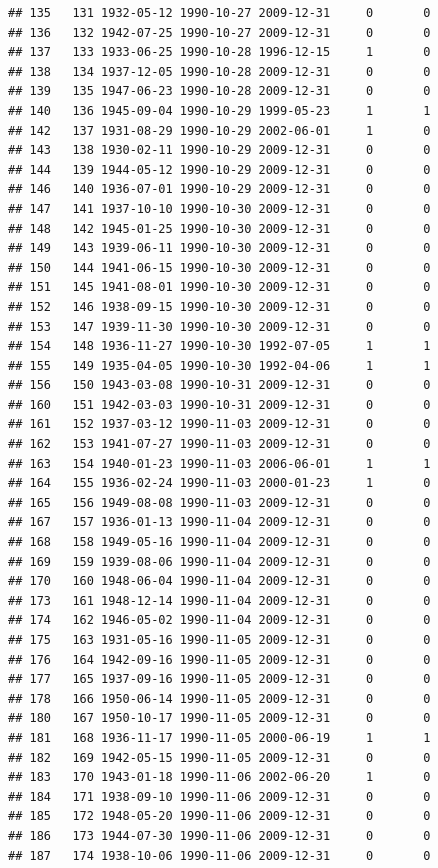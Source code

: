 \documentclass[
]{book}
\begin{document}
\begin{verbatim}
## 135   131 1932-05-12 1990-10-27 2009-12-31     0       0
## 136   132 1942-07-25 1990-10-27 2009-12-31     0       0
## 137   133 1933-06-25 1990-10-28 1996-12-15     1       0
## 138   134 1937-12-05 1990-10-28 2009-12-31     0       0
## 139   135 1947-06-23 1990-10-28 2009-12-31     0       0
## 140   136 1945-09-04 1990-10-29 1999-05-23     1       1
## 142   137 1931-08-29 1990-10-29 2002-06-01     1       0
## 143   138 1930-02-11 1990-10-29 2009-12-31     0       0
## 144   139 1944-05-12 1990-10-29 2009-12-31     0       0
## 146   140 1936-07-01 1990-10-29 2009-12-31     0       0
## 147   141 1937-10-10 1990-10-30 2009-12-31     0       0
## 148   142 1945-01-25 1990-10-30 2009-12-31     0       0
## 149   143 1939-06-11 1990-10-30 2009-12-31     0       0
## 150   144 1941-06-15 1990-10-30 2009-12-31     0       0
## 151   145 1941-08-01 1990-10-30 2009-12-31     0       0
## 152   146 1938-09-15 1990-10-30 2009-12-31     0       0
## 153   147 1939-11-30 1990-10-30 2009-12-31     0       0
## 154   148 1936-11-27 1990-10-30 1992-07-05     1       1
## 155   149 1935-04-05 1990-10-30 1992-04-06     1       1
## 156   150 1943-03-08 1990-10-31 2009-12-31     0       0
## 160   151 1942-03-03 1990-10-31 2009-12-31     0       0
## 161   152 1937-03-12 1990-11-03 2009-12-31     0       0
## 162   153 1941-07-27 1990-11-03 2009-12-31     0       0
## 163   154 1940-01-23 1990-11-03 2006-06-01     1       1
## 164   155 1936-02-24 1990-11-03 2000-01-23     1       0
## 165   156 1949-08-08 1990-11-03 2009-12-31     0       0
## 167   157 1936-01-13 1990-11-04 2009-12-31     0       0
## 168   158 1949-05-16 1990-11-04 2009-12-31     0       0
## 169   159 1939-08-06 1990-11-04 2009-12-31     0       0
## 170   160 1948-06-04 1990-11-04 2009-12-31     0       0
## 173   161 1948-12-14 1990-11-04 2009-12-31     0       0
## 174   162 1946-05-02 1990-11-04 2009-12-31     0       0
## 175   163 1931-05-16 1990-11-05 2009-12-31     0       0
## 176   164 1942-09-16 1990-11-05 2009-12-31     0       0
## 177   165 1937-09-16 1990-11-05 2009-12-31     0       0
## 178   166 1950-06-14 1990-11-05 2009-12-31     0       0
## 180   167 1950-10-17 1990-11-05 2009-12-31     0       0
## 181   168 1936-11-17 1990-11-05 2000-06-19     1       1
## 182   169 1942-05-15 1990-11-05 2009-12-31     0       0
## 183   170 1943-01-18 1990-11-06 2002-06-20     1       0
## 184   171 1938-09-10 1990-11-06 2009-12-31     0       0
## 185   172 1948-05-20 1990-11-06 2009-12-31     0       0
## 186   173 1944-07-30 1990-11-06 2009-12-31     0       0
## 187   174 1938-10-06 1990-11-06 2009-12-31     0       0

\end{verbatim}
\end{document}
